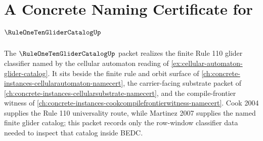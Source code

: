 \chapter{A Concrete Naming Certificate for $\RuleOneTenGliderCatalogUp$}
\label{ch:concrete-instances-rule110glidercatalog-namecert}

The $\RuleOneTenGliderCatalogUp$ packet realizes the finite Rule 110 glider classifier named by the cellular automaton reading of \autoref{ex:cellular-automaton-glider-catalog}. It sits beside the finite rule and orbit surface of \autoref{ch:concrete-instances-cellularautomaton-namecert}, the carrier-facing substrate packet of \autoref{ch:concrete-instances-cellularsubstrate-namecert}, and the compile-frontier witness of \autoref{ch:concrete-instances-cookcompilefrontierwitness-namecert}. Cook 2004 supplies the Rule 110 universality route, while Martinez 2007 supplies the named finite glider catalog; this packet records only the row-window classifier data needed to inspect that catalog inside BEDC.



